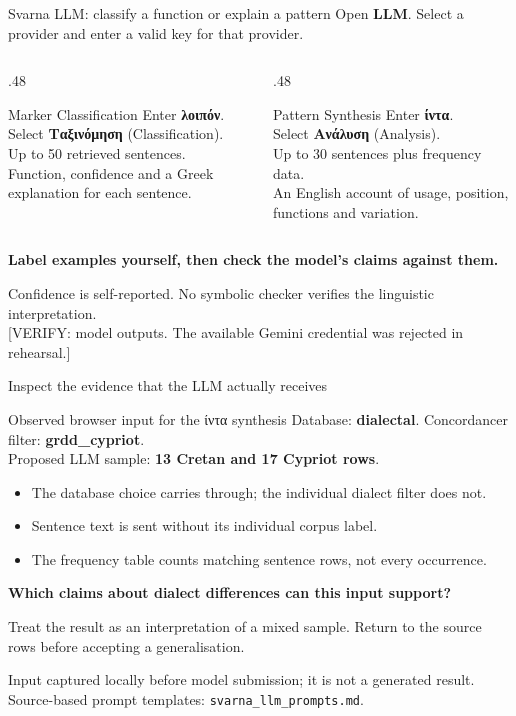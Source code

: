 \documentclass[aspectratio=169,10pt]{beamer}
\newcommand{\key}[1]{\textcolor{aegean}{\textbf{#1}}}
\newcommand{\hl}[1]{\textcolor{terracotta}{\textbf{#1}}}
\newcommand{\source}[1]{\vfill{\scriptsize\color{slate}#1\par}}
\newcommand{\question}[1]{\medskip\par\key{#1}\par}
\begin{document}
\begin{frame}{Svarna LLM: classify a function or explain a pattern}
  \small Open \textbf{LLM}. Select a provider and enter a valid key for that provider.
  \begin{columns}[T]
    \begin{column}{.48\textwidth}
      \begin{block}{Marker Classification}
        Enter \key{λοιπόν}.\\[5pt]
        Select \textbf{Ταξινόμηση} (Classification).\\[5pt]
        Up to 50 retrieved sentences.\\[5pt]
        Function, confidence and a Greek explanation for each sentence.
      \end{block}
    \end{column}
    \begin{column}{.48\textwidth}
      \begin{block}{Pattern Synthesis}
        Enter \key{ίντα}.\\[5pt]
        Select \textbf{Ανάλυση} (Analysis).\\[5pt]
        Up to 30 sentences plus frequency data.\\[5pt]
        An English account of usage, position, functions and variation.
      \end{block}
    \end{column}
  \end{columns}
  \question{Label examples yourself, then check the model's claims against them.}
  \source{Confidence is self-reported. No symbolic checker verifies the linguistic interpretation.\\
  {}[VERIFY: model outputs. The available Gemini credential was rejected in rehearsal.]}
\end{frame}

\begin{frame}{Inspect the evidence that the LLM actually receives}
  \begin{block}{Observed browser input for the ίντα synthesis}
    Database: \key{dialectal}. Concordancer filter: \key{grdd\_cypriot}.\\[5pt]
    Proposed LLM sample: \hl{13 Cretan and 17 Cypriot rows}.
  \end{block}
  \begin{itemize}
    \item The database choice carries through; the individual dialect filter does not.
    \item Sentence text is sent without its individual corpus label.
    \item The frequency table counts matching sentence rows, not every occurrence.
  \end{itemize}
  \question{Which claims about dialect differences can this input support?}
  \small Treat the result as an interpretation of a mixed sample. Return to the source rows before accepting a generalisation.
  \source{Input captured locally before model submission; it is not a generated result.\\
  Source-based prompt templates: \texttt{svarna\_llm\_prompts.md}.}
\end{frame}
\end{document}
